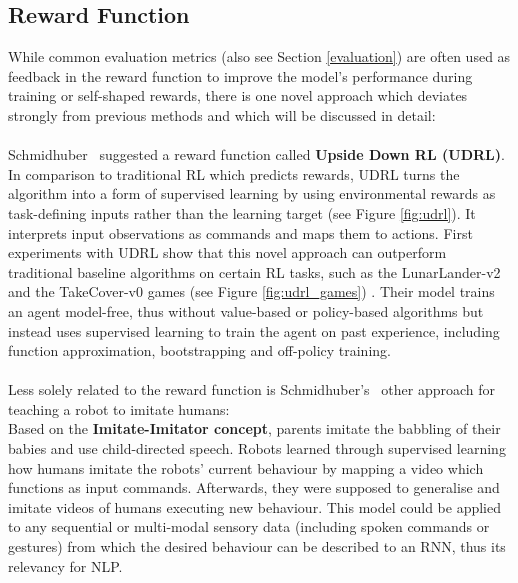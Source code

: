 \documentclass[11pt]{article}
\begin{document}
\subsection{Reward Function}\label{rewardfunction}
While common evaluation metrics (also see Section \ref{evaluation}) are often used as feedback in the reward function to improve the model's performance during training \cite{ranzato2015sequence,wu-etal-2018-study,grissom-ii-etal-2014-dont,chen-bansal-2018-fast} or self-shaped rewards, there is one novel approach which deviates strongly from previous methods and which will be discussed in detail:\\\\
Schmidhuber~ suggested a reward function called \textbf{Upside Down RL (UDRL)}. In comparison to traditional RL which predicts rewards, UDRL turns the algorithm into a form of supervised learning by using environmental rewards as task-defining inputs rather than the learning target (see Figure \ref{fig:udrl}). It interprets input observations as commands and maps them to actions. First experiments with UDRL show that this novel approach can outperform traditional baseline algorithms on certain RL tasks, such as the LunarLander-v2 and the TakeCover-v0 games (see Figure \ref{fig:udrl_games}) \cite{srivastava2019training,openaigym,vizdoom}. Their model trains an agent model-free, thus without value-based or policy-based algorithms but instead uses supervised learning to train the agent on past experience, including function approximation, bootstrapping and off-policy training.\\\\
Less solely related to the reward function is Schmidhuber's~ other approach for teaching a robot to imitate humans:\\ Based on the \textbf{Imitate-Imitator concept}, parents imitate the babbling of their babies and use child-directed speech. Robots learned through supervised learning how humans imitate the robots' current behaviour by mapping a video which functions as input commands. Afterwards, they were supposed to generalise and imitate videos of humans executing new behaviour. This model could be applied to any sequential or multi-modal sensory data (including spoken commands or gestures) from which the desired behaviour can be described to an RNN, thus its relevancy for NLP. 
\end{document}
